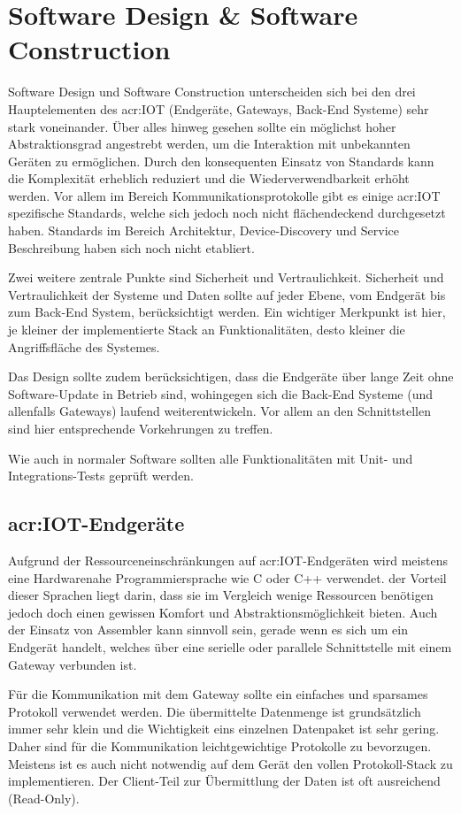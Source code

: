 \section{Software Design \& Software Construction}
Software Design und Software Construction unterscheiden sich bei den drei Hauptelementen des \gls{acr:IOT} (Endgeräte, Gateways, Back-End Systeme) sehr stark voneinander. Über alles hinweg gesehen sollte ein möglichst hoher Abstraktionsgrad angestrebt werden, um die Interaktion mit unbekannten Geräten zu ermöglichen. Durch den konsequenten Einsatz von Standards kann die Komplexität erheblich reduziert und die Wiederverwendbarkeit erhöht werden. Vor allem im Bereich Kommunikationsprotokolle gibt es einige \gls{acr:IOT} spezifische Standards, welche sich jedoch noch nicht flächendeckend durchgesetzt haben. Standards im Bereich Architektur, Device-Discovery und Service Beschreibung haben sich noch nicht etabliert.

Zwei weitere zentrale Punkte sind Sicherheit und Vertraulichkeit. Sicherheit und Vertraulichkeit der Systeme und Daten sollte auf jeder Ebene, vom Endgerät bis zum Back-End System, berücksichtigt werden. Ein wichtiger Merkpunkt ist hier, je kleiner der implementierte Stack an Funktionalitäten, desto kleiner die Angriffsfläche des Systemes.

Das Design sollte zudem berücksichtigen, dass die Endgeräte über lange Zeit ohne Software-Update in Betrieb sind, wohingegen sich die Back-End Systeme (und allenfalls Gateways) laufend weiterentwickeln. Vor allem an den Schnittstellen sind hier entsprechende Vorkehrungen zu treffen.

Wie auch in normaler Software sollten alle Funktionalitäten mit Unit- und Integrations-Tests geprüft werden.

\subsection{\gls{acr:IOT}-Endgeräte}
Aufgrund der Ressourceneinschränkungen auf \gls{acr:IOT}-Endgeräten wird meistens eine Hardwarenahe Programmiersprache wie C oder C++ verwendet. der Vorteil dieser Sprachen liegt darin, dass sie im Vergleich wenige Ressourcen benötigen jedoch doch einen gewissen Komfort und Abstraktionsmöglichkeit bieten. Auch der Einsatz von Assembler kann sinnvoll sein, gerade wenn es sich um ein Endgerät handelt, welches über eine serielle oder parallele Schnittstelle mit einem Gateway verbunden ist.

Für die Kommunikation mit dem Gateway sollte ein einfaches und sparsames Protokoll verwendet werden. Die übermittelte Datenmenge ist grundsätzlich immer sehr klein und die Wichtigkeit eins einzelnen Datenpaket ist sehr gering. Daher sind für die Kommunikation leichtgewichtige Protokolle zu bevorzugen. Meistens ist es auch nicht notwendig auf dem Gerät den vollen Protokoll-Stack zu implementieren. Der Client-Teil zur Übermittlung der Daten ist oft ausreichend (Read-Only).

